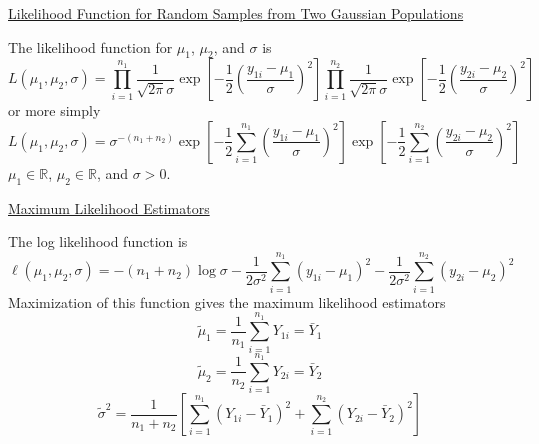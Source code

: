 \underline{Likelihood Function for Random Samples from Two Gaussian Populations}

The likelihood function for $ \mu_1 $, $ \mu_2 $, and $ \sigma $ is
\[L\left(\mu_{1}, \mu_{2}, \sigma\right)=\prod_{i=1}^{n_{1}} \frac{1}{\sqrt{2 \pi} \sigma} \exp \left[-\frac{1}{2}\left(\frac{y_{1 i}-\mu_{1}}{\sigma}\right)^{2}\right] \prod_{i=1}^{n_{2}} \frac{1}{\sqrt{2 \pi} \sigma}
    \exp \left[-\frac{1}{2}\left(\frac{y_{2 i}-\mu_{2}}{\sigma}\right)^{2}\right]\]
or more simply
\[L\left(\mu_{1}, \mu_{2}, \sigma\right)=\sigma^{-\left(n_{1}+n_{2}\right)} \exp \left[-\frac{1}{2} \sum_{i=1}^{n_{1}}\left(\frac{y_{1 i}-\mu_{1}}{\sigma}\right)^{2}\right]
    \exp \left[-\frac{1}{2} \sum_{i=1}^{n_{2}}\left(\frac{y_{2 i}-\mu_{2}}{\sigma}\right)^{2}\right]\]
$ \mu_1\in\mathbb{R} $, $ \mu_2\in\mathbb{R} $, and $ \sigma>0 $.

\underline{Maximum Likelihood Estimators}

The log likelihood function is
\[\ell\left(\mu_{1}, \mu_{2}, \sigma\right)=-\left(n_{1}+n_{2}\right) \log \sigma-\frac{1}{2 \sigma^{2}} \sum_{i=1}^{n_{1}}\left(y_{1 i}-\mu_{1}\right)^{2}
    -\frac{1}{2 \sigma^{2}} \sum_{i=1}^{n_{2}}\left(y_{2 i}-\mu_{2}\right)^{2}\]
Maximization of this function gives the maximum likelihood estimators
\[ \tilde{\mu}_1=\frac{1}{n_1} \sum\limits_{i=1}^{n_1} Y_{1i}=\bar{Y}_1 \]
\[ \tilde{\mu}_2=\frac{1}{n_2} \sum\limits_{i=1}^{n_1} Y_{2i}=\bar{Y}_2 \]
\[ \tilde{\sigma}^2=\frac{1}{n_1+n_2}\left[ \sum\limits_{i=1}^{n_1}
        \left( Y_{1i}-\bar{Y}_1 \right)^2+\sum\limits_{i=1}^{n_2}
        \left( Y_{2i}-\bar{Y}_2 \right)^2 \right]  \]



